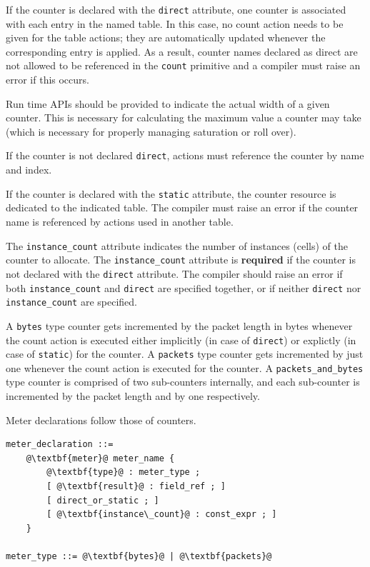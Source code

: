 \documentclass[12pt]{article}
\begin{document}
If the counter is declared with the \texttt{direct} attribute, one
counter is associated with each entry in the named table. In this
case, no count action needs to be given for the table actions; they
are automatically updated whenever the corresponding entry is
applied. As a result, counter names declared as direct are not allowed
to be referenced in the \texttt{count} primitive and a compiler must
raise an error if this occurs.

Run time APIs should be provided to indicate the actual width of a
given counter.  This is necessary for calculating the maximum value a
counter may take (which is necessary for properly managing saturation
or roll over).

If the counter is not declared \texttt{direct}, actions must reference
the counter by name and index.

If the counter is declared with the \texttt{static} attribute, the
counter resource is dedicated to the indicated table. The compiler
must raise an error if the counter name is referenced by actions used
in another table.

The \texttt{instance_count} attribute indicates the number of
instances (cells) of the counter to allocate. The
\texttt{instance_count} attribute is \textbf{required} if the counter
is not declared with the \texttt{direct} attribute.  The compiler
should raise an error if both \texttt{instance_count} and
\texttt{direct} are specified together, or if neither \texttt{direct}
nor \texttt{instance_count} are specified.  

A \texttt{bytes} type counter gets incremented by the packet length in bytes 
whenever the count action is executed either implicitly (in case of 
\texttt{direct}) or explictly (in case of \texttt{static}) for the counter. 
A \texttt{packets} type counter gets incremented by just one whenever 
the count action is executed for the counter. 
A \texttt{packets_and_bytes} type counter is comprised of two sub-counters 
internally, and each sub-counter is incremented by the packet length and 
by one respectively.



Meter declarations follow those of counters.

\begin{lstlisting}[frame=single,backgroundcolor=\color{bnfgreen},escapechar=\@]
meter_declaration ::= 
    @\textbf{meter}@ meter_name {
        @\textbf{type}@ : meter_type ;
        [ @\textbf{result}@ : field_ref ; ]
        [ direct_or_static ; ]
        [ @\textbf{instance\_count}@ : const_expr ; ]
    }

meter_type ::= @\textbf{bytes}@ | @\textbf{packets}@
\end{lstlisting}
\end{document}
